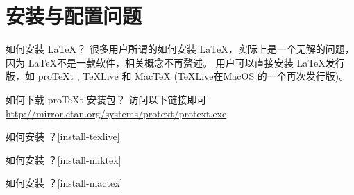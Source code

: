 \section{安装与配置问题}

\begin{faq}{如何安装 \LaTeX{}？}
  很多用户所谓的如何安装 \LaTeX，实际上是一个无解的问题，因为 \LaTeX 不是一款软件，相关概念不再赘述。
  用户可以直接安装 \LaTeX 发行版，如 proTeXt , TeXLive 和 MacTeX (TeXLive在MacOS 的一个再次发行版)。
\end{faq}

\begin{faq}{如何下载 proTeXt 安装包？}
  访问以下链接即可
  \url{http://mirror.ctan.org/systems/protext/protext.exe}
\end{faq}

\begin{faq}{如何安装 \TeXLive{}？}[install-texlive]
\end{faq}

\begin{faq}{如何安装 \MiKTeX{}？}[install-miktex]
\end{faq}

\begin{faq}{如何安装 \MacTeX{}？}[install-mactex]
\end{faq}
